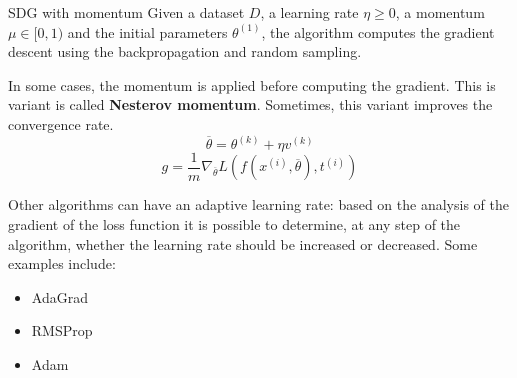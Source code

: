 \documentclass[a4paper, 12pt]{report}
\begin{document}
    \begin{framedalgo}{SDG with momentum}
        Given a dataset $D$, a learning rate $\eta \geq 0$, a momentum $\mu \in [0,1)$ and the initial parameters $\theta^{(1)}$, the algorithm computes the gradient descent using the backpropagation and random sampling.

        \begin{algorithmic}
                \EndWhile
            \EndFunction
        \end{algorithmic}
    \end{framedalgo}

    In some cases, the momentum is applied before computing the gradient. This is variant is called \textbf{Nesterov momentum}. Sometimes, this variant improves the convergence rate.
    \[\overline{\theta} = \theta^{(k)} + \eta v^{(k)}\]
    \[g = \frac{1}{m} \nabla_{\overline{\theta}} L(f(x^{(i)}, \overline{\theta}), t^{(i)})\]

    Other algorithms can have an adaptive learning rate: based on the analysis of the gradient of the loss function it is possible to determine, at any step of the algorithm, whether the learning rate should be increased or decreased. Some examples include:
    \begin{itemize}
        \item AdaGrad
        \item RMSProp
        \item Adam
    \end{itemize}
\end{document}
